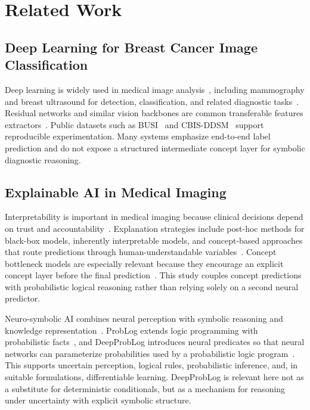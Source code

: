 \section{Related Work}
\label{sec:related}

\subsection{Deep Learning for Breast Cancer Image Classification}
Deep learning is widely used in medical image analysis~\cite{litjens2017survey}, including mammography and breast ultrasound for detection, classification, and related diagnostic tasks~\cite{balkenende2022application}. Residual networks and similar vision backbones are common transferable features extractors~\cite{he2016resnet}. Public datasets such as BUSI~\cite{aldhabyani2020busi} and CBIS-DDSM~\cite{lee2017cbis} support reproducible experimentation. Many systems emphasize end-to-end label prediction and do not expose a structured intermediate concept layer for symbolic diagnostic reasoning.

\subsection{Explainable AI in Medical Imaging}
Interpretability is important in medical imaging because clinical decisions depend on trust and accountability~\cite{vandervelden2022xai,rudin2019stop}. Explanation strategies include post-hoc methods for black-box models, inherently interpretable models, and concept-based approaches that route predictions through human-understandable variables~\cite{koh2020concept}. Concept bottleneck models are especially relevant because they encourage an explicit concept layer before the final prediction~\cite{koh2020concept}. This study couples concept predictions with probabilistic logical reasoning rather than relying solely on a second neural predictor.

Neuro-symbolic AI combines neural perception with symbolic reasoning and knowledge representation~\cite{garcez2002neural,garcez2023neurosymbolic}. ProbLog extends logic programming with probabilistic facts~\cite{deraedt2007problog}, and DeepProbLog introduces neural predicates so that neural networks can parameterize probabilities used by a probabilistic logic program~\cite{manhaeve2018deepproblog,manhaeve2021neural}. This supports uncertain perception, logical rules, probabilistic inference, and, in suitable formulations, differentiable learning. DeepProbLog is relevant here not as a substitute for deterministic conditionals, but as a mechanism for reasoning under uncertainty with explicit symbolic structure.
